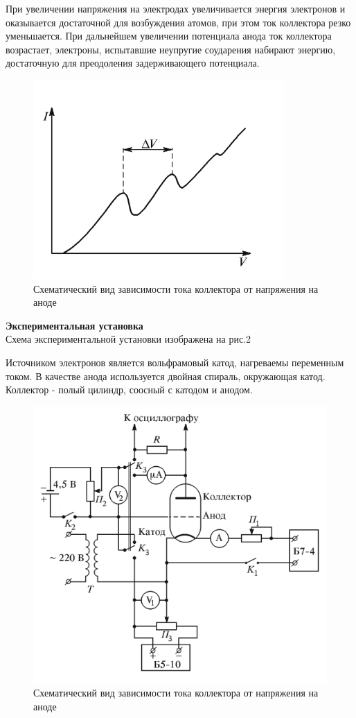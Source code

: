 \documentclass[a4paper, 12pt]{article}%
\begin{document}
При увеличении напряжения на электродах увеличивается энергия электронов и оказывается достаточной для возбуждения атомов, при этом ток коллектора резко уменьшается. При дальнейшем увеличении потенциала анода ток коллектора возрастает, электроны, испытавшие неупругие соударения набирают энергию, достаточную для преодоления задерживающего потенциала.

\begin{figure}[H]
	\centering
	\includegraphics[width=0.6\linewidth]{1}
	\caption{Схематический вид зависимости тока коллектора от напряжения на аноде}
\end{figure}


\textbf{Экспериментальная установка}\\

Схема экспериментальной установки изображена на рис.2

Источником электронов является вольфрамовый катод, нагреваемы переменным током. В качестве анода используется двойная спираль, окружающая катод. Коллектор - полый цилиндр, соосный с катодом и анодом.  

\begin{figure}[H]
	\centering
	\includegraphics[width=0.6\linewidth]{ust}
	\caption{Схематический вид зависимости тока коллектора от напряжения на аноде}
\end{figure}
\end{document}
